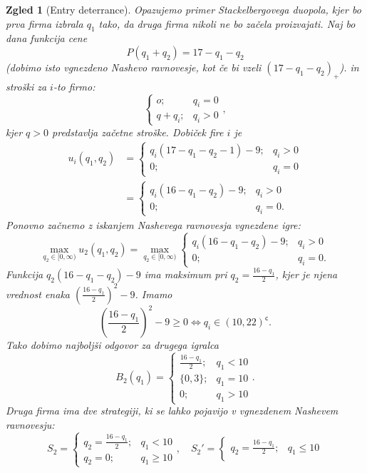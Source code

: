 \documentclass[10pt, a4paper]{article}
\newtheorem{zgled}[izr]{Zgled}
\newcommand{\stcomp}[1]{{#1}^{\mathsf{c}}}
\begin{document}
\begin{zgled}[Entry deterrance]
  Opazujemo primer Stackelbergovega duopola, kjer bo prva firma izbrala $q_1$ tako, da druga firma nikoli ne bo začela proizvajati.
  Naj bo dana funkcija cene 
  $$P(q_1 + q_2) = 17 - q_1 - q_2$$
  (dobimo isto vgnezdeno Nashevo ravnovesje, kot če bi vzeli $(17 - q_1 - q_2)_+$).
  in stroški za $i$-to firmo:
  $$\begin{cases}
    o;& q_i = 0\\
    q + q_i;& q_i > 0
  \end{cases},$$
  kjer $q > 0$ predstavlja začetne stroške.
  Dobiček fire $i$ je 
  \begin{align*}
    u_i (q_1, q_2) &= \begin{cases}
      q_i (17 - q_1 - q_2 - 1) - 9; & q_i > 0\\
      0;& q_i = 0
    \end{cases}\\
    &= \begin{cases}
      q_i (16 - q_1 - q_2) - 9;& q_i > 0\\
      0;& q_i = 0.
    \end{cases}
  \end{align*}
  Ponovno začnemo z iskanjem Nashevega ravnovesja vgnezdene igre:
  $$\max_{q_2 \in [0, \infty)} u_2(q_1, q_2) = \max_{q_2 \in [0, \infty)} \begin{cases}
    q_i (16 - q_1 - q_2) - 9;& q_i > 0\\
    0;& q_i = 0.
  \end{cases}$$
  Funkcija $q_2 (16 - q_1 - q_2) - 9$ ima maksimum pri $q_2 = \frac{16 - q_1}{2}$,
  kjer je njena vrednost enaka $\left(\frac{16 - q_1}{2}\right)^2 - 9$. Imamo 
  $$\left(\frac{16 - q_1}{2}\right)^2 - 9 \geq 0 \Leftrightarrow q_i \in \stcomp{(10, 22)}.$$
  Tako dobimo najboljši odgovor za drugega igralca
  $$B_2 (q_1) = \begin{cases}
    \frac{16 - q_1}{2};& q_1 < 10\\
    \{0, 3\};& q_1 = 10\\
    0;& q_1 > 10
  \end{cases}.$$
  Druga firma ima dve strategiji, ki se lahko pojavijo v vgnezdenem Nashevem ravnovesju:
  $$S_2 = \begin{cases}
    q_2 = \frac{16 - q_1}{2};& q_1 < 10\\
    q_2 = 0;& q_1 \geq 10
  \end{cases},\quad S_2' = \begin{cases}
    q_2 = \frac{16 - q_1}{2};& q_1 \leq 10\\

\end{cases}$$
\end{zgled}
\end{document}
